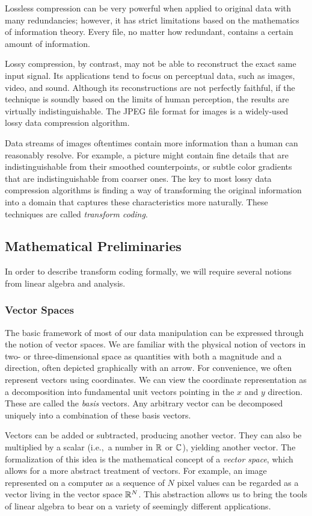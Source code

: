 Lossless compression can be very powerful when applied to original data with many redundancies; however, it has strict limitations based on the mathematics of information theory. Every file, no matter how redundant, contains a certain amount of information. 

Lossy compression, by contrast, may not be able to reconstruct the exact same input signal. Its applications tend to focus on perceptual data, such as images, video, and sound. Although its reconstructions are not perfectly faithful, if the technique is soundly based on the limits of human perception, the results are virtually indistinguishable. The JPEG file format for images is a widely-used lossy data compression algorithm.

Data streams of images oftentimes contain more information than a human can reasonably resolve. For example, a picture might contain fine details that are indistinguishable from their smoothed counterpoints, or subtle color gradients that are indistinguishable from coarser ones. The key to most lossy data compression algorithms is finding a way of transforming the original information into a domain that captures these characteristics more naturally. These techniques are called {\em transform coding}.

\subsection{Mathematical Preliminaries}
In order to describe transform coding formally, we will require several notions from linear algebra and analysis.
\subsubsection{Vector Spaces}
The basic framework of most of our data manipulation can be expressed through the notion of vector spaces. We are familiar with the physical notion of vectors in two- or three-dimensional space as quantities with both a magnitude and a direction, often depicted graphically with an arrow.  For convenience, we often represent vectors using coordinates. We can view the coordinate representation as a decomposition into fundamental unit vectors pointing in the $x$ and $y$ direction. These are called the {\em basis} vectors. Any arbitrary vector can be decomposed uniquely into a combination of these basis vectors. 

Vectors can be added or subtracted, producing another vector. They can also be multiplied by a scalar (i.e.,~a number in $\mathbb{R}$ or $\mathbb{C}$), yielding another vector. The formalization of this idea is the mathematical concept of a {\em vector space}, which allows for a more abstract treatment of vectors. For example, an image represented on a computer as a sequence of $N$ pixel values can be regarded as a vector living in the vector space $\mathbb{R}^N$. This abstraction allows us to bring the tools of linear algebra to bear on a variety of seemingly different applications.

